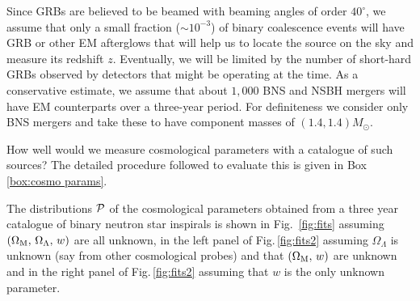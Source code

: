 Since GRBs are believed to be beamed with beaming angles
of order $40^\circ$, we assume
that only a small fraction ($\sim 10^{-3}$) of binary coalescence
events will have GRB or other EM afterglows that will help us
to locate the source on the sky and measure its
redshift $z$. Eventually, we will be limited by the
number of short-hard GRBs observed by detectors that might
be operating at the time. As a conservative estimate, we
assume that about $1,000$ BNS and NSBH mergers will have
EM counterparts over a three-year period. For definiteness we
consider only BNS mergers and take
these to have component masses of $(1.4,1.4) M_\odot$.

How well would we measure cosmological parameters with a
catalogue of such sources? The detailed procedure followed to
evaluate this is given in Box \ref{box:cosmo params}.

The distributions ${\cal P}$ of the cosmological parameters obtained
from a three year catalogue of binary neutron star inspirals is shown 
in Fig.~\ref{fig:fits} assuming $(\Omega_{\rm M},\, \Omega_\Lambda,\, w)$
are all unknown, in the left panel of 
Fig.\,\ref{fig:fits2} assuming $\Omega_\Lambda$ is unknown (say from
other cosmological probes) and that $(\Omega_{\rm M},\, w)$ are unknown
and in the right panel of 
Fig.\,\ref{fig:fits2} assuming that $w$ is the only unknown parameter.

